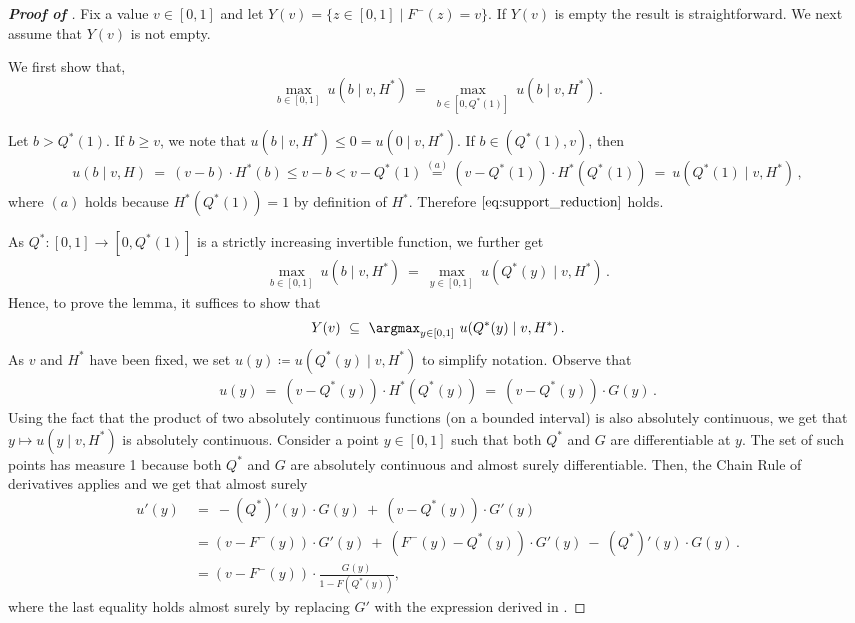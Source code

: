 \begin{proof}[\textbf{Proof of }]
	Fix a value $v \in [0,1]$ and let $Y(v) =\{z \in [0,1] \mid F^-(z) = v\}$. If $Y(v)$ is empty the result is straightforward. We next assume that $Y(v)$ is not empty.
	
    We first show that,
    \begin{equation}
    \label{eq:support_reduction}
        \max_{b \in [0,1]}\ u(b \mid v, H^*)\ =\ \max_{b \in [0,Q^*(1)]}\ u(b \mid v, H^*)\,.
    \end{equation}

    Let $b > Q^*(1)$. If $b \geq v$, we note that $u(b \mid v, H^*) \leq 0 = u(0 \mid v, H^*).$ If $b \in (Q^*(1),v)$, then
	\begin{align*}
		u(b \mid v, H)\ =\ (v - b) \cdot H^*(b) \leq v - b < v - Q^*(1) \stackrel{(a)}{=} (v - Q^*(1))\cdot H^*(Q^*(1))\ =\ u(Q^*(1)\mid v,H^*)\,,
	\end{align*}
    where $(a)$ holds because $H^*(Q^*(1)) = 1$ by definition of $H^*$. Therefore $\eqref{eq:support_reduction}$ holds.
    
	As $Q^*:[0,1] \to [0, Q^*(1)]$ is a strictly increasing invertible function, we further get
	\begin{align*}
		\max_{b \in [0,1]}\ u(b \mid v, H^*)\ =\ \max_{y \in [0,1]}\ u(Q^*(y) \mid v, H^*)\,.
	\end{align*}
	Hence, to prove the lemma, it suffices to show that
	\begin{align}\label{eq:lemma-bid-strat-inter}
		Y(v)\ \subseteq\ \argmax_{y \in [0,1]}\ u(Q^*(y) \mid v, H^*)\,.
	\end{align}
	As $v$ and $H^*$ have been fixed, we set $u(y) \coloneqq u(Q^*(y) \mid v, H^*)$ to simplify notation. Observe that
	\begin{align*}
		u(y)\ =\ (v - Q^*(y)) \cdot H^*(Q^*(y))\ =\ (v - Q^*(y)) \cdot G(y)\,.
	\end{align*}
	Using the fact that the product of two absolutely continuous functions (on a bounded interval) is also absolutely continuous, we get that $y \mapsto u(y \mid v, H^*)$ is absolutely continuous. Consider a point $y\in [0,1]$ such that both $Q^*$ and $G$ are differentiable at $y$. The set of such points has measure 1 because both $Q^*$ and $G$ are absolutely continuous and almost surely differentiable. Then, the Chain Rule of derivatives applies and we get that almost surely 
	\begin{align*}
		u'(y)\ &=\ - (Q^*)'(y) \cdot G(y)\ +\ (v - Q^*(y)) \cdot G'(y)\\
		&= (v - F^-(y)) \cdot G'(y) \ +\ (F^-(y) - Q^*(y)) \cdot G'(y)\ -\ (Q^*)'(y) \cdot G(y) \,.\\
        &= (v - F^-(y)) \cdot \frac{G(y)}{1 - F(Q^*(y))},
	\end{align*} 
    where the last equality holds almost surely by replacing $G'$ with the expression derived in .


\end{proof}
